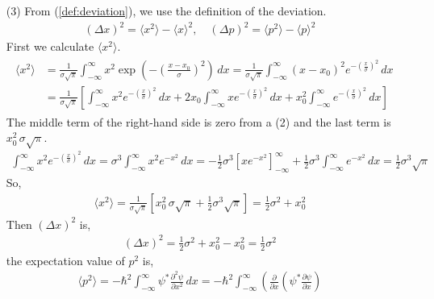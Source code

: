 \documentclass[floatfix,nofootinbib,superscriptaddress,fleqn]{revtex4}
\begin{document}
\begin{itemize}
\item[(3)] From (\ref{def:deviation}), we use the definition of the deviation.
  \begin{align}
    {(\Delta x)}^2 = \langle x^2\rangle - \langle x\rangle^2 ,\quad {(\Delta p)}^2 
    = \langle p^2\rangle - \langle p\rangle^2 
  \end{align}
First we calculate $\langle x^2\rangle$.
  \begin{align*}
    \begin{split}
      \langle x^2\rangle 
      &= \frac{1}{\sigma\sqrt{\pi}}\int_{-\infty}^{\infty} x^2 
      \exp\left(-{\left( \frac{x-x_0}{\sigma}\right)}^2\right)\,dx 
      = \frac{1}{\sigma\sqrt{\pi}}\int_{-\infty}^{\infty}(x-x_0)^2 
      e^{-{\left( \frac{x}{\sigma}\right)}^2}\,dx 
      \\
      &= \frac{1}{\sigma\sqrt{\pi}}\left[\int_{-\infty}^{\infty} x^2 
      e^{-{\left( \frac{x}{\sigma} \right)}^2}\,dx
      +2x_0\int_{-\infty}^{\infty}xe^{-{\left(
      \frac{x}{\sigma}\right)}^2}\,dx
      +x^2_0\int_{-\infty}^{\infty}e^{-{\left(
      \frac{x}{\sigma}\right)}^2}\,dx\right]
      \end{split}
  \end{align*}
The middle term of the right-hand side is zero from a (2) 
and the last term is $x^2_0\,\sigma\sqrt{\pi}$.
  \begin{align*}
    \int_{-\infty}^{\infty} x^2 e^{-{\left(
      \frac{x}{\sigma}\right)}^2}\,dx 
    =\sigma^3\int_{-\infty}^{\infty} x^2e^{-x^2}\,dx 
    =-\frac{1}{2}\sigma^3{\left[xe^{-x^2}\right]}^{\infty}_{-\infty}
    +\frac{1}{2}\sigma^3\int_{-\infty}^{\infty} 
    e^{-x^2}\,dx
    =\frac{1}{2}\sigma^3\sqrt{\pi}
  \end{align*}
So,
  \begin{align*}
    \langle x^2 \rangle = \frac{1}{\sigma\sqrt{\pi}}
    \left[x^2_0\,\sigma\sqrt{\pi}
    +\frac{1}{2}\sigma^3\sqrt{\pi}\right]
   =\frac{1}{2}\sigma^2+x_0^2
  \end{align*}
Then $\left(\Delta x\right)^2$ is,
  \begin{align}
    \left(\Delta x\right)^2 = \frac{1}{2}\sigma^2+x_0^2 
    - x_0^2 = \frac{1}{2}\sigma^2
  \end{align}
the expectation value of $p^2$ is,
  \begin{align*}
    \langle p^2 \rangle = -\hbar^2 \int_{-\infty}^{\infty} \psi^* 
    \frac{\partial^2 \psi}{\partial x^2}\,dx 
    = -\hbar^2\int_{-\infty}^{\infty} \left(\frac{\partial}{\partial x} 
    \left(\psi^*\frac{\partial \psi}{\partial x}\right) 

\end{align*}
\end{itemize}
\end{document}
